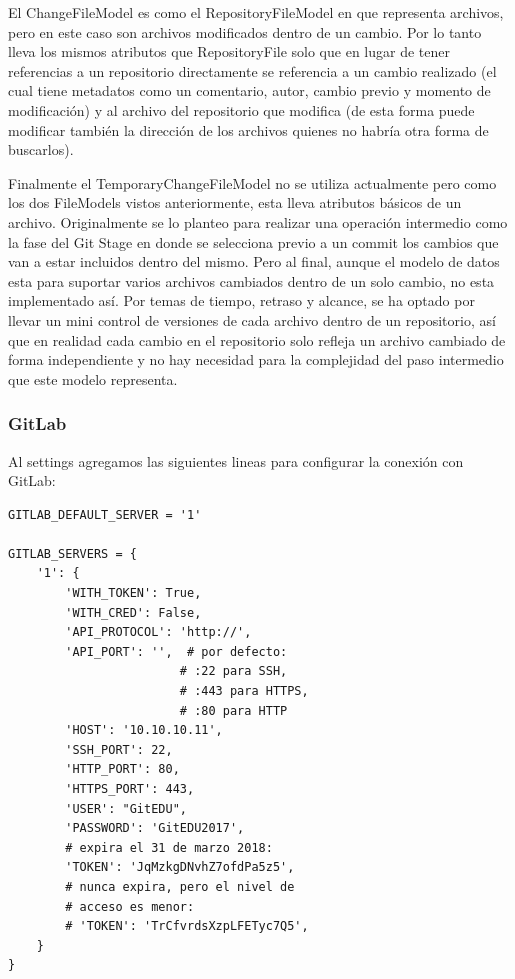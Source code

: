 El ChangeFileModel es como el RepositoryFileModel en que representa archivos, pero en este caso son archivos modificados dentro de un cambio. Por lo tanto lleva los mismos atributos que RepositoryFile solo que en lugar de tener referencias a un repositorio directamente se referencia a un cambio realizado (el cual tiene metadatos como un comentario, autor, cambio previo y momento de modificación) y al archivo del repositorio que modifica (de esta forma puede modificar también la dirección de los archivos quienes no habría otra forma de buscarlos).

Finalmente el TemporaryChangeFileModel no se utiliza actualmente pero como los dos FileModels vistos anteriormente, esta lleva atributos básicos de un archivo. Originalmente se lo planteo para realizar una operación intermedio como la fase del Git Stage en donde se selecciona previo a un commit los cambios que van a estar incluidos dentro del mismo. Pero al final, aunque el modelo de datos esta para suportar varios archivos cambiados dentro de un solo cambio, no esta implementado así. Por temas de tiempo, retraso y alcance, se ha optado por llevar un mini control de versiones de cada archivo dentro de un repositorio, así que en realidad cada cambio en el repositorio solo refleja un archivo cambiado de forma independiente y no hay necesidad para la complejidad del paso intermedio que este modelo representa. 

\subsubsection{GitLab}
Al settings agregamos las siguientes lineas para configurar la conexión con GitLab:
\lstset{language=Python}
\begin{lstlisting}
GITLAB_DEFAULT_SERVER = '1'

GITLAB_SERVERS = {
    '1': {
        'WITH_TOKEN': True,
        'WITH_CRED': False,
        'API_PROTOCOL': 'http://',
        'API_PORT': '',  # por defecto:
                        # :22 para SSH,
                        # :443 para HTTPS,
                        # :80 para HTTP
        'HOST': '10.10.10.11',
        'SSH_PORT': 22,
        'HTTP_PORT': 80,
        'HTTPS_PORT': 443,
        'USER': "GitEDU",
        'PASSWORD': 'GitEDU2017',
        # expira el 31 de marzo 2018:
        'TOKEN': 'JqMzkgDNvhZ7ofdPa5z5',
        # nunca expira, pero el nivel de 
        # acceso es menor:
        # 'TOKEN': 'TrCfvrdsXzpLFETyc7Q5',  
    }
}
\end{lstlisting}
\lstset{language=Bash}

